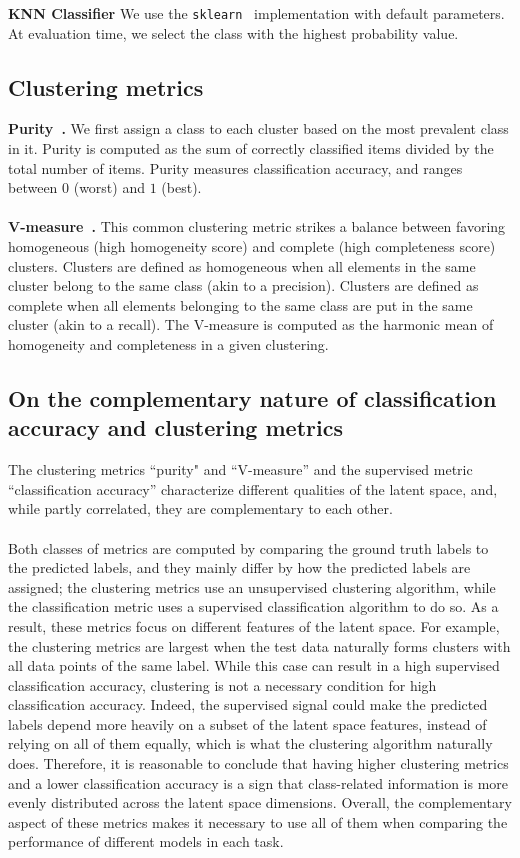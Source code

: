 \noindent\textbf{KNN Classifier}
We use the \texttt{sklearn}~\cite{pedregosa_scikit-learn_2011} implementation with default
parameters. At evaluation time, we select the class with the highest probability value.


\subsection{Clustering metrics}
\label{sec:clustering_metrics}
\noindent\textbf{Purity~\cite{aldenderfer_cluster_1984}.} We first assign a class to each cluster
based on the most prevalent class in it. Purity is computed as the sum of correctly classified
items divided by the total number of items. Purity measures classification accuracy, and ranges
between $0$ (worst) and $1$ (best).\\
\\
\textbf{V-measure~\cite{rosenberg_v-measure_2007}.} This common clustering metric strikes a balance
between favoring homogeneous (high homogeneity score) and complete (high completeness score)
clusters. Clusters are defined as homogeneous when all elements in the same cluster belong to the
same class (akin to a precision). Clusters are   defined as  complete when all elements belonging
to the same class are put in the same cluster (akin to a recall). The V-measure is  computed as the
harmonic mean of homogeneity and completeness in a given clustering.

\subsection{On the complementary nature of classification accuracy and clustering metrics}
The clustering metrics ``purity" and ``V-measure” and the supervised metric  ``classification
accuracy” characterize different qualities of the latent space, and, while partly correlated, they
are complementary to each other.\\
\\
Both classes of metrics are computed by comparing the ground truth labels to the predicted labels,
and they mainly differ by how the predicted labels are assigned; the clustering metrics use  an
unsupervised clustering algorithm, while the classification metric uses a supervised classification
algorithm to do so. As a result, these metrics focus on different features of the latent space. For
example, the clustering metrics are largest when the test data naturally forms clusters with all
data points of the same label.  While this case can result in a high supervised classification
accuracy, clustering is not a necessary condition for high classification accuracy. Indeed, the
supervised signal could make the predicted labels depend more heavily on a subset of the latent
space features, instead of relying on all of them equally, which is what the clustering algorithm
naturally does. Therefore, it is reasonable to conclude that having higher clustering metrics and a
lower classification accuracy is a sign that class-related information is more evenly distributed
across the latent space dimensions. Overall, the complementary aspect of these metrics makes it
necessary to use all of them when comparing the performance of different models in each task.


